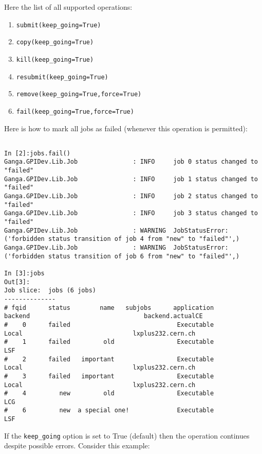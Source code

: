 \documentclass{howto}
\begin{document}
Here the list of all supported operations:

\begin{enumerate}
\item \texttt{submit(keep_going=True)}
\item \texttt{copy(keep_going=True)}
\item \texttt{kill(keep_going=True)}
\item \texttt{resubmit(keep_going=True)}
\item \texttt{remove(keep_going=True,force=True)}
\item \texttt{fail(keep_going=True,force=True)}
\end{enumerate}

Here is how to mark all jobs as failed (whenever this operation is permitted):

\begin{verbatim}

In [2]:jobs.fail()
Ganga.GPIDev.Lib.Job               : INFO     job 0 status changed to "failed"
Ganga.GPIDev.Lib.Job               : INFO     job 1 status changed to "failed"
Ganga.GPIDev.Lib.Job               : INFO     job 2 status changed to "failed"
Ganga.GPIDev.Lib.Job               : INFO     job 3 status changed to "failed"
Ganga.GPIDev.Lib.Job               : WARNING  JobStatusError:  ('forbidden status transition of job 4 from "new" to "failed"',)
Ganga.GPIDev.Lib.Job               : WARNING  JobStatusError:  ('forbidden status transition of job 6 from "new" to "failed"',)

In [3]:jobs
Out[3]:
Job slice:  jobs (6 jobs)
--------------
# fqid      status        name   subjobs      application          backend                               backend.actualCE
#    0      failed                             Executable            Local                              lxplus232.cern.ch
#    1      failed         old                 Executable              LSF
#    2      failed   important                 Executable            Local                              lxplus232.cern.ch
#    3      failed   important                 Executable            Local                              lxplus232.cern.ch
#    4         new         old                 Executable              LCG
#    6         new  a special one!             Executable              LSF

\end{verbatim}

If the \texttt{keep_going} option is set to True (default) then the operation continues despite possible errors. Consider this example:
\end{document}
